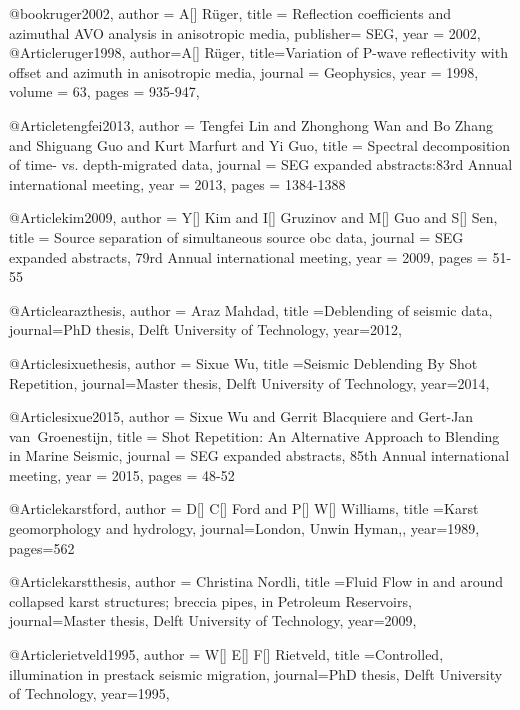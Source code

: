 @book{ruger2002,
  author = 	 {A[] R\"{u}ger},
  title  = 	 {Reflection coefficients and azimuthal AVO analysis in anisotropic media},
  publisher= 	 {SEG},
  year   = 	 2002,
}
@Article{ruger1998,
  author={A[] R\"{u}ger},
  title={Variation of P-wave reflectivity with offset and azimuth in anisotropic media},
  journal = 	 {Geophysics},
  year = 	 1998,
  volume =	 63,
  pages =	 {935-947},
}

@Article{tengfei2013,
  author = 	 {Tengfei Lin and Zhonghong Wan and Bo Zhang and Shiguang Guo and Kurt Marfurt and Yi Guo},
  title = 	 {Spectral decomposition of time- vs. depth-migrated data},
  journal = 	 {SEG expanded abstracts:83rd Annual international meeting},
  year = 	 2013,
  pages =	 {1384-1388}
}

@Article{kim2009,
  author = 	 {Y[] Kim and I[] Gruzinov and M[] Guo and S[] Sen},
  title = 	 {Source separation of simultaneous source obc data},
  journal = 	 {SEG expanded abstracts, 79rd Annual international meeting},
  year = 	 2009,
  pages =	 {51-55}
}

@Article{arazthesis,
  author = {Araz Mahdad},
  title ={Deblending of seismic data},
  journal={PhD thesis, Delft University of Technology},
  year=2012,
}

@Article{sixuethesis,
  author = {Sixue Wu},
  title ={Seismic Deblending By Shot Repetition},
  journal={Master thesis, Delft University of Technology},
  year=2014,
}

@Article{sixue2015,
  author = 	 {Sixue Wu and Gerrit Blacquiere and Gert-Jan van~Groenestijn},
  title = 	 {Shot Repetition: An Alternative Approach to Blending in Marine Seismic},
  journal = 	 {SEG expanded abstracts, 85th Annual international meeting},
  year = 	 2015,
  pages =	 {48-52}
}



@Article{karstford,
  author = {D[] C[] Ford and P[] W[] Williams},
  title ={Karst geomorphology and hydrology},
  journal={London, Unwin Hyman,},
  year=1989,
  pages={562}
}

@Article{karstthesis,
  author = {Christina Nordli},
  title ={Fluid Flow in and around collapsed karst structures; breccia pipes, in
Petroleum Reservoirs},
  journal={Master thesis, Delft University of Technology},
  year=2009,
}


@Article{rietveld1995,
  author = {W[] E[] F[] Rietveld},
  title ={Controlled, illumination in prestack seismic migration},
  journal={PhD thesis, Delft University of Technology},
  year=1995,
}

